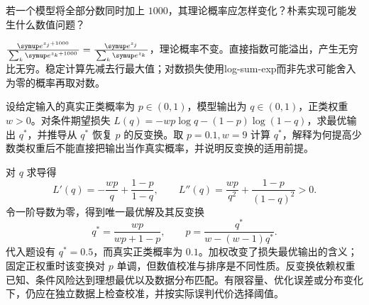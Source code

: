 \begin{exercises}
\begin{exercise} 若一个模型将全部分数同时加上 $1000$，其理论概率应怎样变化？朴素实现可能发生什么数值问题？

\begin{solution}
$\frac{\conste{}^{z_j+1000}}{\sum_k\conste{}^{z_k+1000}}=\frac{\conste{}^{z_j}}{\sum_k\conste{}^{z_k}}$，理论概率不变。直接指数可能溢出，产生无穷比无穷。稳定计算先减去行最大值；对数损失使用log-sum-exp而非先求可能舍入为零的概率再取对数。
\end{solution}
\end{exercise}

\begin{exercise} 设给定输入的真实正类概率为 $p\in(0,1)$，模型输出为 $q\in(0,1)$，正类权重 $w>0$。对条件期望损失 $L(q)=-wp\log q-(1-p)\log(1-q)$，求最优输出 $q^*$，并推导从 $q^*$ 恢复 $p$ 的反变换。取 $p=0.1,w=9$ 计算 $q^*$，解释为何提高少数类权重后不能直接把输出当作真实概率，并说明反变换的适用前提。

\begin{solution}
对 $q$ 求导得
\[
L'(q)=-\frac{wp}{q}+\frac{1-p}{1-q},\qquad
L''(q)=\frac{wp}{q^2}+\frac{1-p}{(1-q)^2}>0.
\]
令一阶导数为零，得到唯一最优解及其反变换
\[
q^*=\frac{wp}{wp+1-p},\qquad
p=\frac{q^*}{w-(w-1)q^*}.
\]
代入题设有 $q^*=0.5$，而真实正类概率为 $0.1$。加权改变了损失最优输出的含义；固定正权重时该变换对 $p$ 单调，但数值校准与排序是不同性质。反变换依赖权重已知、条件风险达到理想最优以及数据分布匹配。有限容量、优化误差或分布变化下，仍应在独立数据上检查校准，并按实际误判代价选择阈值。
\end{solution}
\end{exercise}

\end{exercises}
